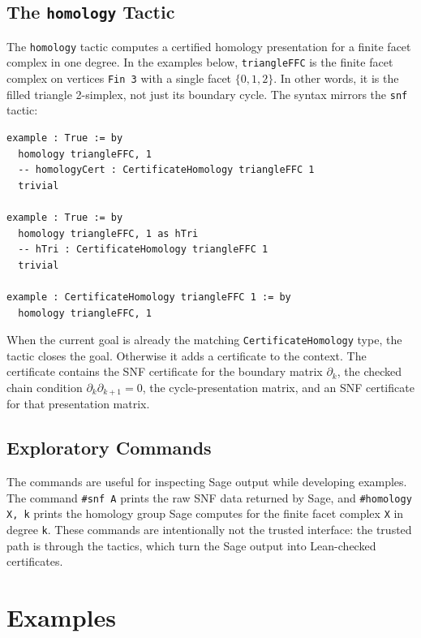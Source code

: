 \documentclass[11pt]{article}
\theoremstyle{plain}
\theoremstyle{definition}
\theoremstyle{remark}
\newcommand{\lean}[1]{\lstinline[language=lean]|#1|}
\begin{document}
\subsection{The \texttt{homology} Tactic}

The \lean{homology} tactic computes a certified homology presentation for a
finite facet complex in one degree. In the examples below,
\lean{triangleFFC} is the finite facet complex on vertices \lean{Fin 3} with a
single facet \(\{0,1,2\}\). In other words, it is the filled triangle
2-simplex, not just its boundary cycle. The syntax mirrors the \lean{snf}
tactic:

\begin{lstlisting}[caption={Using the \texttt{homology} tactic.},label={lst:homology-tactic}]
example : True := by
  homology triangleFFC, 1
  -- homologyCert : CertificateHomology triangleFFC 1
  trivial

example : True := by
  homology triangleFFC, 1 as hTri
  -- hTri : CertificateHomology triangleFFC 1
  trivial

example : CertificateHomology triangleFFC 1 := by
  homology triangleFFC, 1
\end{lstlisting}

When the current goal is already the matching \lean{CertificateHomology} type,
the tactic closes the goal. Otherwise it adds a certificate to the context. The
certificate contains the SNF certificate for the boundary matrix
\(\partial_k\), the checked chain condition
\(\partial_k\partial_{k+1}=0\), the cycle-presentation matrix, and an SNF
certificate for that presentation matrix.

\subsection{Exploratory Commands}

The commands are useful for inspecting Sage output while developing examples.
The command \lean{#snf A} prints the raw SNF data returned by Sage, and
\lean{#homology X, k} prints the homology group Sage computes for the finite
facet complex \lean{X} in degree \lean{k}. These commands are intentionally not
the trusted interface: the trusted path is through the tactics, which turn the
Sage output into Lean-checked certificates.

\section{Examples}\label{sec:examples}
\end{document}
